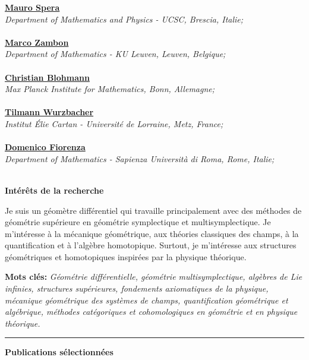\documentclass[a4paper]{article}
\newcommand{\block}[1]{\hrule \vspace{0.2cm} \textbf{\Large #1} \vspace{0.2cm}}
\newcommand{\blockNp}[1]{\newpage \textbf{\Large #1} \vspace{0.2cm}}
\newcommand{\voice}[5]{\href{#4}{\textbf{#1}} \hfill #2 \\ \textit{#3} \\ {\small #5} \vspace{0.2cm} \\}
\begin{document}
\begin{minipage}[t]{0.375\columnwidth}
    
    \voice{Mauro Spera}
        {}
        {Department of Mathematics and Physics - UCSC, Brescia, Italie;}
        {http://docenti.unicatt.it/ita/mauro_spera/}       
        {\vspace{-0.5cm}}
    \voice{Marco Zambon}
        {}
        {Department of Mathematics - KU Leuven, Leuven, Belgique;}
        {https://perswww.kuleuven.be/~u0096206/}       
        {\vspace{-0.5cm}}
    \voice{Christian Blohmann}
        {}
        {Max Planck Institute for Mathematics, Bonn, Allemagne;}
        {http://people.mpim-bonn.mpg.de/blohmann/}       
        {\vspace{-0.5cm}}
    \voice{Tilmann Wurzbacher}
        {}
        {Institut \'Elie Cartan - Universit\'e de Lorraine, Metz, France;}
        {https://iecl.univ-lorraine.fr/membre-iecl/wurzbacher-tilmann/}       
        {\vspace{-0.5cm}}
    \voice{Domenico Fiorenza}
        {}
        {Department of Mathematics - Sapienza Università di Roma, Rome, Italie;}
        {https://research.uniroma1.it/researcher/127cc95b4c09611e93641941dbd6d74ef318c7b45accf7992e4a914f}       
        {\vspace{-0.5cm}}
        



\end{minipage}


\blockNp{Intérêts de la recherche}

{Je suis un géomètre différentiel qui travaille principalement avec des méthodes de géométrie supérieure en géométrie symplectique et multisymplectique. Je m'intéresse à la mécanique géométrique, aux théories classiques des champs, à la quantification et à l'algèbre homotopique. Surtout, je m'intéresse aux structures géométriques et homotopiques inspirées par la physique théorique.\vspace{0.25em}

\textbf{Mots clés: }\it Géométrie différentielle, géométrie multisymplectique, algèbres de Lie infinies, structures supérieures, fondements axiomatiques de la physique, mécanique géométrique des systèmes de champs, quantification géométrique et algébrique, méthodes catégoriques et cohomologiques en géométrie et en physique théorique.}

\vspace{0.3cm}

\block{Publications sélectionnées}
\nocite{Miti2021,Miti2019,Miti2019a}
\printbibliography[heading=none]
\vspace{.5em}
\end{document}
